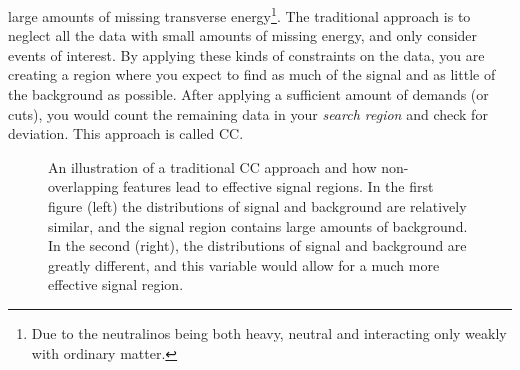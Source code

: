 large amounts of missing transverse energy\footnote{Due to the neutralinos being both heavy, neutral 
and interacting only weakly with ordinary matter.}. The traditional approach is to neglect all the data 
with small amounts of missing energy, and only consider events of interest. By applying these kinds of 
constraints on the data, you are creating a region where you expect to find as much of the signal and as little 
of the background as possible. After applying a sufficient amount of demands (or cuts), you would count the 
remaining data in your \emph{search region} and check for deviation. This approach is called \acf{CC}.
\\
\begin{figure} 
    \centering
    \caption{An illustration of a traditional \acf{CC} approach and how non-overlapping features lead to effective
    signal regions. In the first figure (left) the distributions of signal and background are relatively similar, and 
    the signal region contains large amounts of background. In the second (right), the distributions of signal and 
    background are greatly different, and this variable would allow for a much more effective signal region. }
    \label{fig:overlap}
\end{figure}
